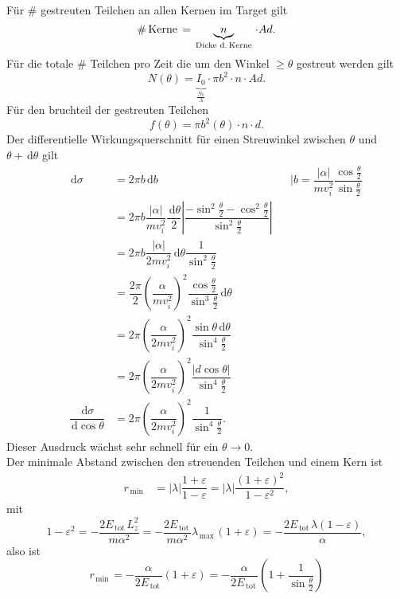 \documentclass[a4paper,12pt]{article}
\newcommand{\td}{\,\text{d}}
\numberwithin{equation}{section}
\begin{document}
Für $\#$ gestreuten Teilchen an allen Kernen im Target gilt
\[ 
        \#\,\text{Kerne}\,=\underbrace{n}_{\,\text{Dicke d.\,Kerne}\,}\cdot Ad
.\] 
Für die totale $\#$ Teilchen pro Zeit die um den Winkel $\geq \theta $ gestreut werden gilt
\[ 
        N\left(\theta \right)=\underbrace{I_0}_{\tfrac{N_0}{A}}\cdot \pi b^2\cdot n\cdot Ad
.\] 
Für den bruchteil der gestreuten Teilchen
\[ 
        f\left(\theta \right)=\pi b^2\left(\theta \right)\cdot n\cdot d
.\] 
Der differentielle Wirkungsquerschnitt für einen Streuwinkel zwischen $\theta $ und $\theta +\td \theta $ gilt
\begin{align*}
        &&\td \sigma &=2\pi b\td b&&|b=\dfrac{|\alpha |}{mv_i^2}\dfrac{\cos \tfrac{\theta }{2}}{\sin \tfrac{\theta }{2}}\\
        &&&=2\pi b\dfrac{|\alpha |}{mv_i^2}\dfrac{\td \theta }{2}\left| \dfrac{-\sin ^2 \tfrac{\theta }{2}-\cos ^2 \tfrac{\theta }{2}}{\sin ^2 \tfrac{\theta }{2}}\right|\\
        &&&=2\pi b\dfrac{|\alpha |}{2mv_i^2}\td \theta \dfrac{1}{\sin ^2 \tfrac{\theta }{2}}\\
        &&&=\dfrac{2\pi }{2}\left(\dfrac{\alpha }{mv_i^2}\right)^2\dfrac{\cos \tfrac{\theta }{2}}{\sin ^3 \tfrac{\theta }{2}}\td \theta \\
        &&&=2\pi \left(\dfrac{\alpha }{2mv_i^2}\right)^2\dfrac{\sin \theta \td \theta }{\sin ^4 \tfrac{\theta }{2}}\\
        &&&=2\pi \left(\dfrac{\alpha }{2mv_i^2}\right)^2\dfrac{|d\cos \theta |}{\sin ^4 \tfrac{\theta }{2}}\\
        &&\dfrac{\td \sigma }{\td \cos \theta }&=2\pi \left(\dfrac{\alpha }{2mv_i^2}\right)^2\dfrac{1}{\sin ^4 \tfrac{\theta }{2}}
.\end{align*}
Dieser Ausdruck wächst sehr schnell für ein $\theta \rightarrow 0$.\\\indent
Der minimale Abstand zwischen den streuenden Teilchen und einem Kern ist
\begin{align*}
        r_{\,\text{min}\,}&=|\lambda |\dfrac{1+\varepsilon }{1-\varepsilon }=|\lambda |\dfrac{\left(1+\varepsilon \right)^2}{1-\varepsilon ^2}
,\end{align*}
mit
\[ 
        1-\varepsilon ^2=-\dfrac{2E_{\,\text{tot}\,}L_z^2}{m\alpha ^2}=-\dfrac{2E_{\,\text{tot}\,}}{m\alpha ^2}\lambda _{\,\text{max}\,}\left(1+\varepsilon \right)=-\dfrac{2E_{\,\text{tot}\,}\lambda \left(1-\varepsilon \right)}{\alpha }
,\] 
also ist
\[ 
        r_{\,\text{min}\,}=-\dfrac{\alpha }{2E_{\,\text{tot}\,}}\left(1+\varepsilon \right)=-\dfrac{\alpha }{2E_{\,\text{tot}\,}}\left(1+\dfrac{1}{\sin \tfrac{\theta }{2}}\right)
\] 
\end{document}

